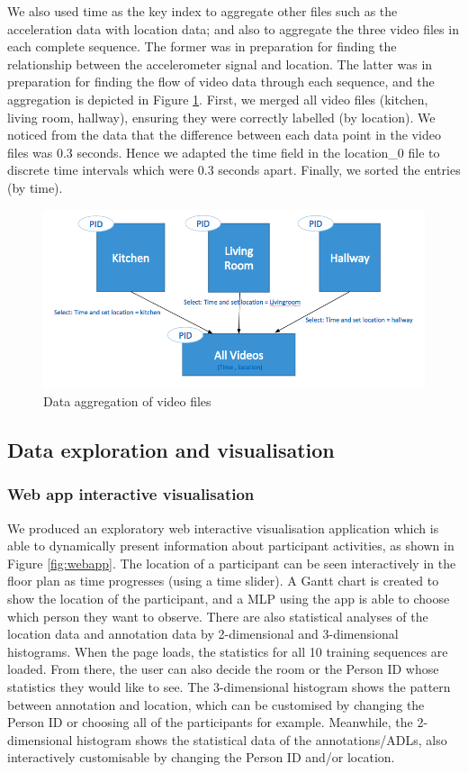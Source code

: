 \documentclass[fleqn,10pt]{SelfArx} %
\begin{document}
We also used time as the key index to aggregate other files such as the acceleration data with location data; and also to aggregate the three video files in each complete sequence. The former was in preparation for finding the relationship between the accelerometer signal and location. The latter was in preparation for finding the flow of video data through each sequence, and the aggregation is depicted in Figure \ref{fig:data-agg2}. First, we merged all video files (kitchen, living room, hallway), ensuring they were correctly labelled (by location). We noticed from the data that the difference between each data point in the video files was 0.3 seconds. Hence we adapted the time field in the location{\_}0 file to discrete time intervals which were 0.3 seconds apart. Finally, we sorted the entries (by time). \\

\begin{figure}[!h] \centering
	\includegraphics[scale=0.3]{data-agg2} 
	\caption{Data aggregation of video files}
	\label{fig:data-agg2}
\end{figure}

	\subsection{Data exploration and visualisation}
\subsubsection{Web app interactive visualisation}
We produced an exploratory web interactive visualisation application which is able to dynamically present information about participant activities, as shown in Figure \ref{fig:webapp}. The location of a participant can be seen interactively in the floor plan as time progresses (using a time slider). A Gantt chart is created to show the location of the participant, and a MLP using the app is able to choose which person they want to observe. There are also statistical analyses of the location data and annotation data by 2-dimensional and 3-dimensional histograms. When the page loads, the statistics for all 10 training sequences are loaded. From there, the user can also decide the room or the Person ID whose statistics they would like to see. The 3-dimensional histogram shows the pattern between annotation and location, which can be customised by changing the Person ID or choosing all of the participants for example.  Meanwhile, the 2-dimensional histogram shows the statistical data of the annotations/ADLs, also interactively customisable by changing the Person ID and/or location. \\
\end{document}
